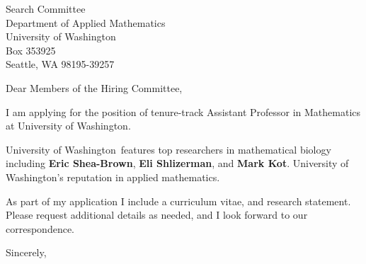 \documentclass[11pt,a4paper]{letter}
\begin{document}

\def\School{University of Washington}

\begin{letter}
{Search Committee\\
Department of Applied Mathematics\\
University of Washington\\
Box 353925\\
Seattle, WA 98195-39257}


\opening{Dear Members of the Hiring Committee,}

I am applying for the position of tenure-track Assistant Professor in Mathematics at \School. 



\School~features top researchers in mathematical biology including \textbf{Eric Shea-Brown}, \textbf{Eli Shlizerman}, and \textbf{Mark Kot}. \School's reputation in applied mathematics.



As part of my application I include a curriculum vitae, and research statement. Please request additional details as needed, and I look forward to our correspondence.

\closing{Sincerely,}
\end{letter}
\end{document}

